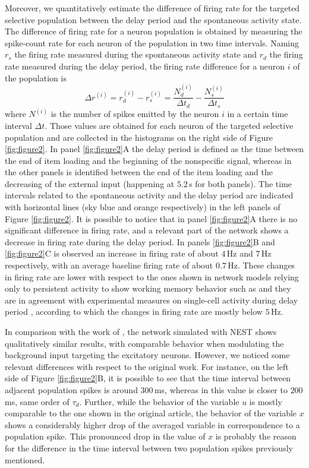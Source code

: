 \documentclass[a4paper, 12pt, twoside, openright]{book}
\begin{document}
Moreover, we quantitatively estimate the difference of firing rate for the targeted selective population between the delay period and the spontaneous activity state. The difference of firing rate for a neuron population is obtained by measuring the spike-count rate for each neuron of the population in two time intervals. Naming $r_s$ the firing rate measured during the spontaneous activity state and $r_d$ the firing rate measured during the delay period, the firing rate difference for a neuron $i$ of the population is 
\begin{equation}
    \Delta r^{(i)} = r^{(i)}_d - r^{(i)}_s = \frac{N^{(i)}_d}{\Delta t_d} - \frac{N^{(i)}_s}{\Delta t_s}
\end{equation}
where $N^{(i)}$ is the number of spikes emitted by the neuron $i$ in a certain time interval $\Delta t$. Those values are obtained for each neuron of the targeted selective population and are collected in the histograms on the right side of Figure \ref{fig:figure2}. In panel \ref{fig:figure2}A the delay period is defined as the time between the end of item loading and the beginning of the nonspecific signal, whereas in the other panels is identified between the end of the item loading and the decreasing of the external input (happening at $5.2$\,s for both panels). The time intervals related to the spontaneous activity and the delay period are indicated with horizontal lines (sky blue and orange respectively) in the left panels of Figure \ref{fig:figure2}. It is possible to notice that in panel \ref{fig:figure2}A there is no significant difference in firing rate, and a relevant part of the network shows a decrease in firing rate during the delay period. In panels \ref{fig:figure2}B and \ref{fig:figure2}C is observed an increase in firing rate of about $4$\,Hz and $7$\,Hz respectively, with an average baseline firing rate of about $0.7$\,Hz. These changes in firing rate are lower with respect to the ones shown in network models relying only to persistent activity to show working memory behavior such as \cite{Brunel2000} and they are in agreement with experimental measures on single-cell activity during delay period \cite{Shafi2007}, according to which the changes in firing rate are mostly below $5$\,Hz.


In comparison with the work of \cite{Mongillo2008}, the network simulated with NEST shows qualitatively similar results, with comparable behavior when modulating the background input targeting the excitatory neurons. However, we noticed some relevant differences with respect to the original work.
For instance, on the left side of Figure \ref{fig:figure2}B, it is possible to see that the time interval between adjacent population spikes is around $300$\,ms, whereas in \cite{Mongillo2008} this value is closer to $200$\,ms, same order of $\tau_d$. Further, while the behavior of the variable $u$ is mostly comparable to the one shown in the original article, the behavior of the variable $x$ shows a considerably higher drop of the averaged variable in correspondence to a population spike. This pronounced drop in the value of $x$ is probably the reason for the difference in the time interval between two population spikes previously mentioned. 
\end{document}
